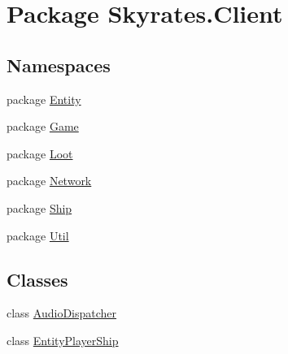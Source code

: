 \hypertarget{namespace_skyrates_1_1_client}{\section{Package Skyrates.\-Client}
\label{namespace_skyrates_1_1_client}
}
\subsection*{Namespaces}
\begin{DoxyCompactItemize}
\item 
package \hyperlink{namespace_skyrates_1_1_client_1_1_entity}{Entity}
\item 
package \hyperlink{namespace_skyrates_1_1_client_1_1_game}{Game}
\item 
package \hyperlink{namespace_skyrates_1_1_client_1_1_loot}{Loot}
\item 
package \hyperlink{namespace_skyrates_1_1_client_1_1_network}{Network}
\item 
package \hyperlink{namespace_skyrates_1_1_client_1_1_ship}{Ship}
\item 
package \hyperlink{namespace_skyrates_1_1_client_1_1_util}{Util}
\end{DoxyCompactItemize}
\subsection*{Classes}
\begin{DoxyCompactItemize}
\item 
class \hyperlink{class_skyrates_1_1_client_1_1_audio_dispatcher}{Audio\-Dispatcher}
\item 
class \hyperlink{class_skyrates_1_1_client_1_1_entity_player_ship}{Entity\-Player\-Ship}
\end{DoxyCompactItemize}
